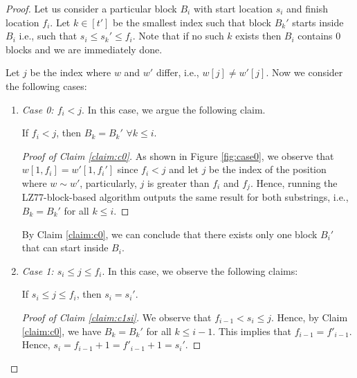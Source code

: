 \begin{proof} Let us consider a particular block $B_i$ with start location $s_i$ and finish location $f_i$. Let $k\in[t']$ be the smallest index such that block $B_k'$ starts inside $B_i$ i.e., such that $s_i \leq s_k' \leq f_i$. Note that if no such $k$ exists then $B_i$ contains $0$ blocks and we are immediately done. 

Let $j$ be the index where $w$ and $w'$ differ, i.e., $w[j]\neq w'[j]$. Now we consider the following cases:

\begin{enumerate}

\label{case:a}    \item \emph{Case 0: \(f_i < j\)}. In this case, we argue the following claim.

    \begin{claim}\label{claim:c0}
        If $f_i<j$, then $B_k=B_k'\,\,\forall k\leq i$.
    \end{claim}
    \begin{proof}[Proof of Claim \ref{claim:c0}]
        As shown in Figure \ref{fig:case0}, we observe that $w[1,f_i]=w'[1,f_i']$ since $f_i<j$ and let $j$ be the index of the position where $w \sim w'$, particularly, $j$ is greater than $f_i$ and $f_j$. Hence, running the LZ77-block-based algorithm outputs the same result for both substrings, i.e., $B_k=B_k'$ for all $k\leq i$.
    \end{proof}


    

By Claim \ref{claim:c0}, we can conclude that there exists only one block $B_i'$ that can start inside $B_i$.


\label{case:b}    \item \emph{Case 1: \(s_i \leq j \leq f_i\)}. In this case, we observe the following claims:

    \begin{claim}\label{claim:c1si}
        If $s_i\leq j\leq f_i$, then $s_i=s_i'$.
    \end{claim}
    \begin{proof}[Proof of Claim \ref{claim:c1si}]
        We observe that $f_{i-1}<s_i\leq j$. Hence, by Claim \ref{claim:c0}, we have $B_k=B_k'$ for all $k\leq i-1$. This implies that $f_{i-1}=f'_{i-1}$. Hence, $s_i=f_{i-1}+1=f'_{i-1}+1=s_i'$.
    \end{proof}


\end{enumerate}
\end{proof}
